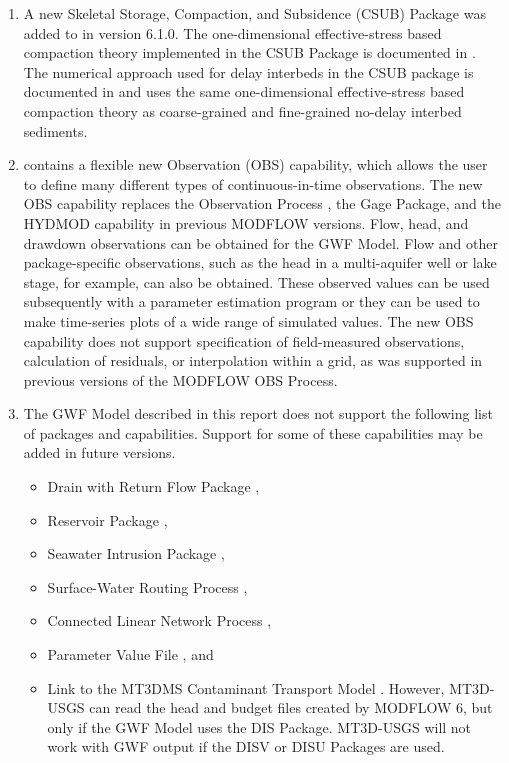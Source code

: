 \begin{enumerate}
\item A new Skeletal Storage, Compaction, and Subsidence (CSUB) Package was added to \mf in version 6.1.0. The one-dimensional effective-stress based compaction theory implemented in the CSUB Package is documented in \cite{leake2007modflow}. The numerical approach used for delay interbeds in the CSUB package is documented in \cite{hoffmann2003modflow} and uses the same one-dimensional effective-stress based compaction theory as coarse-grained and fine-grained no-delay interbed sediments.

\item \mf contains a flexible new Observation (OBS) capability, which allows the user to define many different types of continuous-in-time observations.  The new OBS capability replaces the Observation Process \citep{hill2000modflow}, the Gage Package, and the HYDMOD capability \citep{hanson1999documentation} in previous MODFLOW versions.  Flow, head, and drawdown observations can be obtained for the GWF Model.  Flow and other package-specific observations, such as the head in a multi-aquifer well or lake stage, for example, can also be obtained.  These observed values can be used subsequently with a parameter estimation program or they can be used to make time-series plots of a wide range of simulated values.  The new OBS capability does not support specification of field-measured observations, calculation of residuals, or interpolation within a grid, as was supported in previous versions of the MODFLOW OBS Process.

\item The GWF Model described in this report does not support the following list of packages and capabilities.  Support for some of these capabilities may be added in future \mf versions.
  \begin{itemize}
    \item Drain with Return Flow Package \citep{modflowdrtpack},
    \item Reservoir Package \citep{fenske1996documentation},
    \item Seawater Intrusion Package \citep{bakker2013documentation},
    \item Surface-Water Routing Process \citep{hughes2012documentation},
    \item Connected Linear Network Process \citep{modflowusg},
    \item Parameter Value File \citep{modflow2005}, and
    \item Link to the MT3DMS Contaminant Transport Model \citep{zheng2001modflow}.  However, MT3D-USGS can read the head and budget files created by MODFLOW 6, but only if the GWF Model uses the DIS Package.  MT3D-USGS will not work with GWF output if the DISV or DISU Packages are used.
  \end{itemize}

\end{enumerate}

